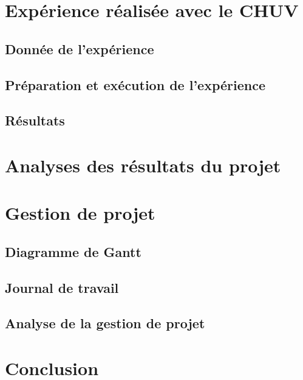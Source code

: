 \documentclass[a4paper,10pt,openany,oneside]{sphinxmanual}
\begin{document}
\chapter{Expérience réalisée avec le CHUV}
\label{index:experience-realisee-avec-le-chuv}

\section{Donnée de l'expérience}
\label{index:donnee-de-l-experience}

\section{Préparation et exécution de l'expérience}
\label{index:preparation-et-execution-de-l-experience}

\section{Résultats}
\label{index:resultats}

\chapter{Analyses des résultats du projet}
\label{index:analyses-des-resultats-du-projet}

\chapter{Gestion de projet}
\label{index:gestion-de-projet}

\section{Diagramme de Gantt}
\label{index:diagramme-de-gantt}

\section{Journal de travail}
\label{index:journal-de-travail}

\section{Analyse de la gestion de projet}
\label{index:analyse-de-la-gestion-de-projet}

\chapter{Conclusion}
\label{index:conclusion}
\end{document}
